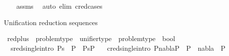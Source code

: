 \begin{isabellebody}
%
\isadelimproof
\ \ %
\endisadelimproof
%
\isatagproof
{}\isamarkupfalse%
\ assms\ \isamarkupfalse%
\ {\isacharparenleft}{\kern0pt}auto\ elim{\isacharcolon}{\kern0pt}\ c{\isacharunderscore}{\kern0pt}red{\isachardot}{\kern0pt}cases{\isacharparenright}{\kern0pt}%
\endisatagproof
{\isafoldproof}%
%
\isadelimproof
%
\endisadelimproof
%
\begin{isamarkuptext}%
Unification reduction sequences%
\end{isamarkuptext}\isamarkuptrue%
\isamarkupfalse%
\ red{\isacharunderscore}{\kern0pt}plus\ {\isacharcolon}{\kern0pt}{\isacharcolon}{\kern0pt}\ {\isachardoublequoteopen}problem{\isacharunderscore}{\kern0pt}type\ {\isasymRightarrow}\ unifier{\isacharunderscore}{\kern0pt}type\ {\isasymRightarrow}\ problem{\isacharunderscore}{\kern0pt}type\ {\isasymRightarrow}\ bool{\isachardoublequoteclose}\ {\isacharparenleft}{\kern0pt}{\isachardoublequoteopen}{\isacharunderscore}{\kern0pt}\ {\isasymTurnstile}\ {\isacharunderscore}{\kern0pt}\ {\isasymRightarrow}\ {\isacharunderscore}{\kern0pt}\ {\isachardoublequoteclose}\ {\isacharbrackleft}{\kern0pt}{}{}{\isacharcomma}{\kern0pt}{}{}{\isacharcomma}{\kern0pt}{}{}{\isacharbrackright}{\kern0pt}\ {}{}{\isacharparenright}{\kern0pt}\isanewline
\ \ \isanewline
\ \ sred{\isacharunderscore}{\kern0pt}single{\isacharbrackleft}{\kern0pt}intro{\isacharbang}{\kern0pt}{\isacharbrackright}{\kern0pt}{\isacharcolon}{\kern0pt}\ {\isachardoublequoteopen}{\isasymlbrakk}P{}{\isasymturnstile}s{}\ {\isasymleadsto}\ P{}{\isasymrbrakk}\ {\isasymLongrightarrow}\ P{}{\isasymTurnstile}{\isacharparenleft}{\kern0pt}{\isacharbraceleft}{\kern0pt}{\isacharbraceright}{\kern0pt}{\isacharcomma}{\kern0pt}s{}{\isacharparenright}{\kern0pt}{\isasymRightarrow}P{}{\isachardoublequoteclose}\ {\isacharbar}{\kern0pt}\isanewline
\ \ cred{\isacharunderscore}{\kern0pt}single{\isacharbrackleft}{\kern0pt}intro{\isacharbang}{\kern0pt}{\isacharbrackright}{\kern0pt}{\isacharcolon}{\kern0pt}\ {\isachardoublequoteopen}{\isasymlbrakk}P{}{\isasymturnstile}nabla{}{\isasymrightarrow}P{}{\isasymrbrakk}\ {\isasymLongrightarrow}\ P{}\ {\isasymTurnstile}\ {\isacharparenleft}{\kern0pt}nabla{}{\isacharcomma}{\kern0pt}{\isacharbrackleft}{\kern0pt}{\isacharbrackright}{\kern0pt}{\isacharparenright}{\kern0pt}\ {\isasymRightarrow}\ P{}{\isachardoublequoteclose}\ {\isacharbar}{\kern0pt}\isanewline

\end{isabellebody}
